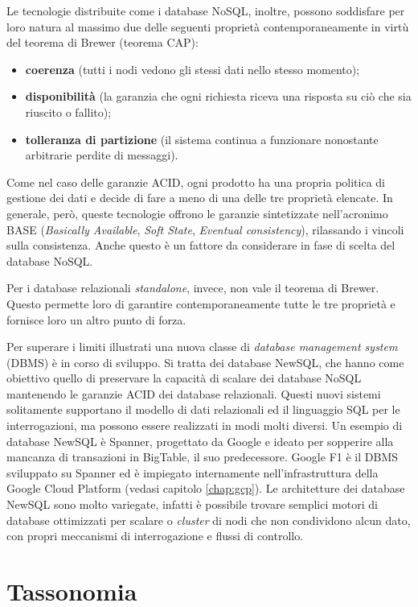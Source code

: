 Le tecnologie distribuite come i database NoSQL, inoltre, possono soddisfare per loro natura al massimo due delle seguenti proprietà contemporaneamente in virtù del teorema di 
Brewer (teorema CAP):
\begin{itemize}
 \item \textbf{coerenza} (tutti i nodi vedono gli stessi dati nello stesso momento);
 \item \textbf{disponibilità} (la garanzia che ogni richiesta riceva una risposta su ciò che sia riuscito o fallito);
 \item \textbf{tolleranza di partizione} (il sistema continua a funzionare nonostante arbitrarie perdite di messaggi).
\end{itemize}

Come nel caso delle garanzie ACID, ogni prodotto ha una propria politica di gestione dei dati e decide di fare a meno di una delle tre proprietà elencate. In generale, però, 
queste tecnologie offrono le garanzie sintetizzate nell’acronimo BASE (\textit{Basically Available}, \textit{Soft State}, \textit{Eventual consistency}), rilassando i vincoli sulla consistenza. Anche 
questo è un fattore da considerare in fase di scelta del database NoSQL.

Per i database relazionali \textit{standalone}, invece, non vale il teorema di Brewer. Questo permette loro di garantire contemporaneamente tutte le tre proprietà e fornisce loro un 
altro punto di forza.

Per superare i limiti illustrati una nuova classe di \textit{database management system} (DBMS) è in corso di sviluppo. Si tratta dei database NewSQL, che hanno come obiettivo quello 
di preservare la capacità di scalare dei database NoSQL mantenendo le garanzie ACID dei database relazionali. Questi nuovi sistemi solitamente supportano il modello di dati 
relazionali ed il linguaggio SQL per le interrogazioni, ma possono essere realizzati in modi molti diversi. Un esempio di database NewSQL è Spanner, progettato da Google e ideato 
per sopperire alla mancanza di transazioni in BigTable, il suo predecessore. Google F1 è il DBMS sviluppato su Spanner ed è impiegato internamente nell’infrastruttura della 
Google Cloud Platform (vedasi capitolo \ref{chap:gcp}). Le architetture dei database NewSQL sono molto variegate, infatti è possibile trovare semplici motori di database ottimizzati per scalare
o \textit{cluster} di nodi che non condividono alcun dato, con propri meccanismi di interrogazione e flussi di controllo.


\section{Tassonomia}

